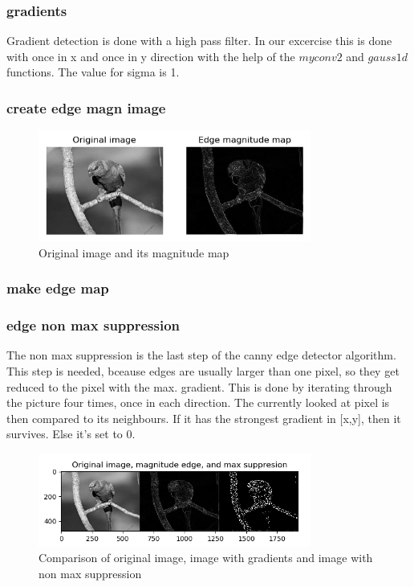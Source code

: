 \documentclass[12pt]{article}
\begin{document}
\subsubsection{gradients}
Gradient detection is done with a high pass filter. In our excercise this is done with
once in x and once in y direction with the help of the $myconv2$ and $gauss1d$ functions.
The value for sigma is 1. 

\subsubsection{create edge magn image}

\begin{figure}[!htb]
    \centering
    \includegraphics[width=0.8\textwidth]{pics/edgeMagnitudeMap}
    \caption{Original image and its magnitude map}
\end{figure}

\subsubsection{make edge map}


\subsubsection{edge non max suppression}
The non max suppression is the last step of the canny edge detector algorithm.
This step is needed, bceause edges are usually larger than one pixel, so they
get reduced to the pixel with the max. gradient.
\newline
This is done by iterating through the picture four times, once in each direction. 
The currently looked at pixel is then compared to its neighbours. If it has the
strongest gradient in [x,y], then it survives. Else it's set to 0.

\begin{figure}[!htb]
    \centering
    \includegraphics[width=0.8\textwidth]{pics/origMagNonMax}
    \caption{Comparison of original image, image with gradients and image with non max suppression}
\end{figure}
\end{document}
